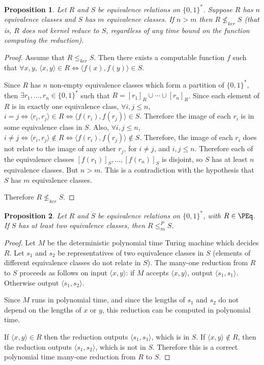 \documentclass[draft]{article}
\newtheorem{proposition}[proposition]{Proposition}
\theoremstyle{definition} \newtheorem{openproblem}[openproblem]{Open problem}
\theoremstyle{definition} \newtheorem{definition}[definition]{Definition}
\theoremstyle{remark} \newtheorem{remark}[remark]{Remark}
\newcommand{\sigmastar}{\{0, 1\}^{*}} %
\newcommand{\krnt}{\leq_{ker}} %
\newcommand{\nkrnt}{\nleq_{ker}} %
\newcommand{\mor}{\leq^{P}_{m}} %
\newcommand{\pair}[2]{\langle#1,#2\rangle} %
\begin{document}
\begin{proposition}\label{prop:noreduction}
  Let $R$ and $S$ be equivalence relations on $\sigmastar$.
  Suppose $R$ has $n$ equivalence classes and $S$ has $m$ equivalence classes.
  If $n>m$ then $R\nkrnt S$ (that is, $R$ does not kernel reduce to $S$, regardless of any time bound on the function computing the reduction).
\end{proposition}
\begin{proof}
  Assume that $R\krnt S$.
  Then there exists a computable function $f$ such that $\forall x,y$, $\pair{x}{y}\in R\iff \pair{f(x)}{f(y)}\in S$.

  Since $R$ has $n$ non-empty equivalence classes which form a partition of $\sigmastar$, then $\exists r_1,\ldots,r_n\in\sigmastar$ such that $R=[r_1]_R\cup\cdots\cup[r_n]_R$.
  Since each element of $R$ is in exactly one equivalence class, $\forall i,j\leq n$, $i=j\iff\pair{r_i}{r_j}\in R\iff\pair{f(r_i)}{f(r_j)}\in S$.
  Therefore the image of each $r_i$ is in some equivalence class in $S$.
  Also, $\forall i,j\leq n$, $i\neq j\iff \pair{r_i}{r_j}\notin R\iff \pair{f(r_i)}{f(r_j)}\notin S$.
  Therefore, the image of each $r_i$ does not relate to the image of any other $r_j$, for $i\neq j$, and $i,j\leq n$.
  Therefore each of the equivalence classes $[f(r_1)]_S,\ldots,[f(r_n)]_S$ is disjoint, so $S$ has at least $n$ equivalence classes.
  But $n>m$.
  This is a contradiction with the hypothesis that $S$ has $m$ equivalence classes.

  Therefore $R\nkrnt S$.
\end{proof}

\begin{proposition}\label{prop:tworeduction}
  Let $R$ and $S$ be equivalence relations on $\sigmastar$, with $R\in\PEq$.
  If $S$ has at least two equivalence classes, then $R\mor S$.
\end{proposition}
\begin{proof}
  Let $M$ be the deterministic polynomial time Turing machine which decides $R$.
  Let $s_1$ and $s_2$ be representatives of two equivalence classes in $S$ (elements of different equivalence classes do not relate in $S$).
  The many-one reduction from $R$ to $S$ proceeds as follows on input $\pair{x}{y}$: if $M$ accepts $\pair{x}{y}$, output $\pair{s_1}{s_1}$.
  Otherwise output $\pair{s_1}{s_2}$.

  Since $M$ runs in polynomial time, and since the lengths of $s_1$ and $s_2$ do not depend on the lengths of $x$ or $y$, this reduction can be computed in polynomial time.

  If $\pair{x}{y}\in R$ then the reduction outputs $\pair{s_1}{s_1}$, which is in $S$.
  If $\pair{x}{y}\notin R$, then the reduction outputs $\pair{s_1}{s_2}$, which is not in $S$.
  Therefore this is a correct polynomial time many-one reduction from $R$ to $S$.
\end{proof}
\end{document}
